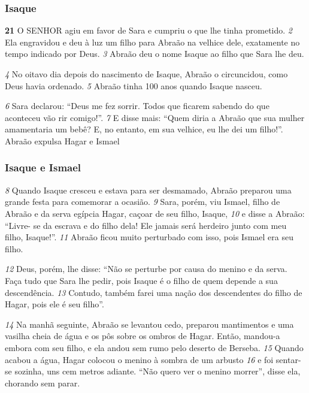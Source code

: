 \bigskip   
\subsubsection*{Isaque}
\textbf{\large 21}
 O SENHOR agiu em favor de Sara e cumpriu o que lhe tinha prometido. 
\textit{\tiny 2}
Ela
engravidou e deu à luz um filho para Abraão na velhice dele, exatamente no
tempo indicado por Deus. 
\textit{\tiny 3}
Abraão deu o nome Isaque ao filho que Sara lhe deu.

\bigskip   
\textit{\tiny 4}
No oitavo dia depois do nascimento de Isaque, Abraão o circuncidou, como Deus
havia ordenado. 
\textit{\tiny 5}
Abraão tinha 100 anos quando Isaque nasceu.

\bigskip   
\textit{\tiny 6}
Sara declarou: “Deus me fez sorrir. Todos que ficarem sabendo do que
aconteceu vão rir comigo!”. 
\textit{\tiny 7}
E disse mais: “Quem diria a Abraão que sua mulher
amamentaria um bebê? E, no entanto, em sua velhice, eu lhe dei um filho!”.
Abraão expulsa Hagar e Ismael

\bigskip   
\subsubsection*{Isaque e Ismael}
\textit{\tiny 8}
Quando Isaque cresceu e estava para ser desmamado, Abraão preparou uma
grande festa para comemorar a ocasião. 
\textit{\tiny 9}
Sara, porém, viu Ismael, filho de Abraão
e da serva egípcia Hagar, caçoar de seu filho, Isaque,
\textit{\tiny 10}
e disse a Abraão: “Livre-
se da escrava e do filho dela! Ele jamais será herdeiro junto com meu filho,
Isaque!”.
\textit{\tiny 11}
Abraão ficou muito perturbado com isso, pois Ismael era seu filho. 

\bigskip   
\textit{\tiny 12}
Deus,
porém, lhe disse: “Não se perturbe por causa do menino e da serva. Faça tudo que
Sara lhe pedir, pois Isaque é o filho de quem depende a sua descendência.
\textit{\tiny 13}
Contudo, também farei uma nação dos descendentes do filho de Hagar, pois ele
é seu filho”.

\bigskip   
\textit{\tiny 14}
Na  manhã seguinte, Abraão se levantou cedo, preparou mantimentos e uma
vasilha cheia de água e os pôs sobre os ombros de Hagar. Então, mandou-a
embora com seu filho, e ela andou sem rumo pelo deserto de Berseba.
\textit{\tiny 15}
Quando acabou a água, Hagar colocou o menino à sombra de um arbusto 
\textit{\tiny 16}
e
foi sentar-se sozinha, uns cem metros adiante. “Não quero ver o menino
morrer”, disse ela, chorando sem parar.

